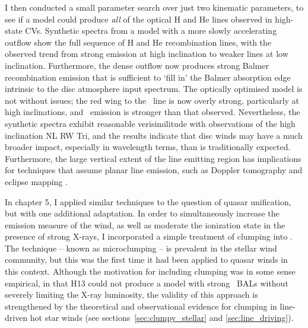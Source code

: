 I then conducted a small parameter search over just two kinematic parameters, 
to see if a model could produce {\em all} of the optical H and He lines observed 
in high-state CVs. Synthetic spectra from a model 
with a more slowly accelerating outflow show 
the full sequence of H and He recombination lines, with 
the observed trend from strong emission at high inclination to weaker lines
at low inclination. Furthermore, the dense outflow now produces strong Balmer
recombination emission that is sufficient to `fill in' the Balmer 
absorption edge intrinsic to the disc atmosphere input spectrum. The optically
optimised model is not without issues; the red wing to the \civ\ line
is now overly strong, particularly at high inclinations, and \heii\ emission
is stronger than that observed. Nevertheless, the synthetic spectra exhibit
reasonable verisimilitude with observations of the high inclination NL RW Tri,
and the results indicate that disc winds may have a much broader impact,
especially in wavelength terms, than is traditionally expected. Furthermore,
the large vertical extent of the line emitting region has implications
for techniques that assume planar line emission, such as Doppler tomography 
\citep[e.g.][]{marsh1988} and eclipse mapping \citep[e.g.][]{horne1994}.

In chapter 5, I applied similar techniques to the question of quasar 
unification, but with one additional adaptation. In order to simultaneously
increase the emission measure of the wind, as well as moderate the ionization
state in the presence of strong X-rays, I incorporated a simple treatment of clumping 
into \py. The technique -- known as microclumping -- is prevalent 
in the stellar wind community, but this was the first time it had been
applied to quasar winds in this context. Although the motivation for including
clumping was in some sense empirical, in that H13 could not produce a 
model with strong \civ\ BALs without severely limiting the X-ray luminosity, 
the validity of this approach is strengthened by the theoretical and observational
evidence for clumping in line-driven hot star winds 
(see sections~\ref{sec:clumpy_stellar} and \ref{sec:line_driving}).

